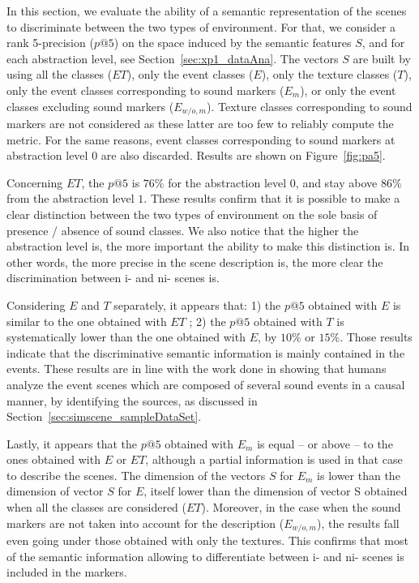 \documentclass[twoside,twocolumn]{article}
\begin{document}
In this section, we evaluate the ability of a semantic representation of the scenes to discriminate between the two types of environment. For that, we consider a rank 5-precision ($p@5$) on the space induced by the semantic features $S$, and for each abstraction level, see Section~\ref{sec:xp1_dataAna}. The vectors $S$ are built by using all the classes ($ET$), only the event classes ($E$), only the texture classes ($T$), only the event classes corresponding to sound markers ($E_m$), or only the event classes excluding sound markers ($E_{w/o,m}$). Texture classes corresponding to sound markers are not considered as these latter are too few to reliably compute the metric. For the same reasons, event classes corresponding to sound markers at abstraction level $0$ are also discarded. Results are shown on Figure~\ref{fig:pa5}.

Concerning $ET$, the $p@5$ is $76\%$ for the abstraction level $0$, and stay above $86\%$ from the abstraction level $1$. These results confirm that it is possible to make a clear distinction between the two types of environment on the sole basis of presence / absence of sound classes. We also notice that the higher the abstraction level is, the more important the ability to make this distinction is. In other words, the more precise in the scene description is, the more clear the discrimination between i- and ni- scenes is.

Considering $E$ and $T$ separately, it appears that: 1) the $p@5$ obtained with $E$ is similar to the one obtained with $ET$ ; 2) the $p@5$ obtained with $T$ is systematically lower than the one obtained with $E$, by $10\%$ or $15\%$. Those results indicate that the discriminative semantic information is mainly contained in the events. These results are in line with the work done in \cite{maffiolo_caracterisation_1999} showing that humans analyze the event scenes which are composed of several sound events in a causal manner, \ie by identifying the sources, as discussed in Section~\ref{sec:simscene_sampleDataSet}.

Lastly, it appears that the $p@5$ obtained with $E_m$ is equal – or above – to the ones obtained with $E$ or $ET$, although a partial information is used in that case to describe the scenes. The dimension of the vectors $S$ for $E_m$ is lower than the dimension of vector $S$ for $E$, itself lower than the dimension of vector S obtained when all the classes are considered ($ET$). Moreover, in the case when the sound markers are not taken into account for the description ($E_{w/o,m}$), the results fall even going under those obtained with only the textures. This confirms that most of the semantic information allowing to differentiate between i- and ni- scenes is included in the markers.
\end{document}
